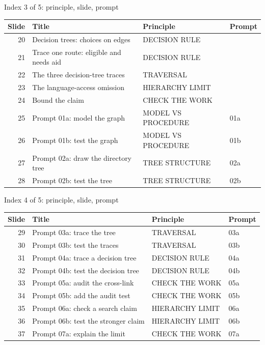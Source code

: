 \begin{frame}{Index 3 of 5: principle, slide, prompt}
\scriptsize
\begin{tabular}{@{}r>{\raggedright\arraybackslash}p{5.1cm}>{\raggedright\arraybackslash}p{4.7cm}p{1.2cm}@{}}
\textbf{Slide} & \textbf{Title} & \textbf{Principle} & \textbf{Prompt}\\\midrule
20 & Decision trees: choices on edges & DECISION RULE & \\
21 & Trace one route: eligible and needs aid & DECISION RULE & \\
22 & The three decision-tree traces & TRAVERSAL & \\
23 & The language-access omission & HIERARCHY LIMIT & \\
24 & Bound the claim & CHECK THE WORK & \\
25 & Prompt 01a: model the graph & MODEL VS PROCEDURE & 01a\\
26 & Prompt 01b: test the graph & MODEL VS PROCEDURE & 01b\\
27 & Prompt 02a: draw the directory tree & TREE STRUCTURE & 02a\\
28 & Prompt 02b: test the tree & TREE STRUCTURE & 02b\\
\end{tabular}
\end{frame}
\begin{frame}{Index 4 of 5: principle, slide, prompt}
\scriptsize
\begin{tabular}{@{}r>{\raggedright\arraybackslash}p{5.1cm}>{\raggedright\arraybackslash}p{4.7cm}p{1.2cm}@{}}
\textbf{Slide} & \textbf{Title} & \textbf{Principle} & \textbf{Prompt}\\\midrule
29 & Prompt 03a: trace the tree & TRAVERSAL & 03a\\
30 & Prompt 03b: test the traces & TRAVERSAL & 03b\\
31 & Prompt 04a: trace a decision tree & DECISION RULE & 04a\\
32 & Prompt 04b: test the decision tree & DECISION RULE & 04b\\
33 & Prompt 05a: audit the cross-link & CHECK THE WORK & 05a\\
34 & Prompt 05b: add the audit test & CHECK THE WORK & 05b\\
35 & Prompt 06a: check a search claim & HIERARCHY LIMIT & 06a\\
36 & Prompt 06b: test the stronger claim & HIERARCHY LIMIT & 06b\\
37 & Prompt 07a: explain the limit & CHECK THE WORK & 07a\\
\end{tabular}
\end{frame}
